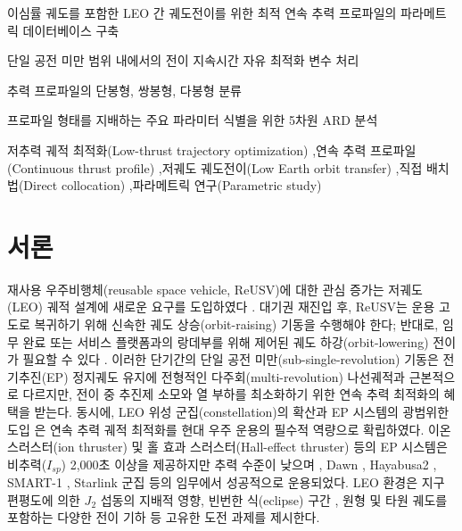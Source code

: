 \documentclass[a4paper,fleqn]{cas-dc}
\begin{document}

\begin{highlights}
\item 이심률 궤도를 포함한 LEO 간 궤도전이를 위한 최적 연속 추력 프로파일의 파라메트릭 데이터베이스 구축
\item 단일 공전 미만 범위 내에서의 전이 지속시간 자유 최적화 변수 처리
\item 추력 프로파일의 단봉형, 쌍봉형, 다봉형 분류
\item 프로파일 형태를 지배하는 주요 파라미터 식별을 위한 5차원 ARD 분석
\end{highlights}

\begin{keywords}
저추력 궤적 최적화(Low-thrust trajectory optimization) \sep 연속 추력 프로파일(Continuous thrust profile) \sep 저궤도 궤도전이(Low Earth orbit transfer) \sep 직접 배치법(Direct collocation) \sep 파라메트릭 연구(Parametric study)
\end{keywords}

\maketitle


\section{서론}\label{sec:introduction}

재사용 우주비행체(reusable space vehicle, ReUSV)에 대한 관심 증가는 저궤도(LEO) 궤적 설계에 새로운 요구를 도입하였다 \citep{Baiocco2021,Grantz2011}. 대기권 재진입 후, ReUSV는 운용 고도로 복귀하기 위해 신속한 궤도 상승(orbit-raising) 기동을 수행해야 한다; 반대로, 임무 완료 또는 서비스 플랫폼과의 랑데부를 위해 제어된 궤도 하강(orbit-lowering) 전이가 필요할 수 있다 \citep{Jung2025}. 이러한 단기간의 단일 공전 미만(sub-single-revolution) 기동은 전기추진(EP) 정지궤도 유지에 전형적인 다주회(multi-revolution) 나선궤적과 근본적으로 다르지만, 전이 중 추진제 소모와 열 부하를 최소화하기 위한 연속 추력 최적화의 혜택을 받는다. 동시에, LEO 위성 군집(constellation)의 확산과 EP 시스템의 광범위한 도입 \citep{Lev2019}은 연속 추력 궤적 최적화를 현대 우주 운용의 필수적 역량으로 확립하였다. 이온 스러스터(ion thruster) 및 홀 효과 스러스터(Hall-effect thruster) 등의 EP 시스템은 비추력($I_{sp}$) 2,000초 이상을 제공하지만 추력 수준이 낮으며 \citep{Jahn1968,Goebel2008}, Dawn \citep{Rayman2000}, Hayabusa2 \citep{Tsuda2020}, SMART-1 \citep{Racca2002}, Starlink 군집 \citep{SpaceNews2023} 등의 임무에서 성공적으로 운용되었다. LEO 환경은 지구 편평도에 의한 $J_2$ 섭동의 지배적 영향, 빈번한 식(eclipse) 구간 \citep{Graham2016}, 원형 및 타원 궤도를 포함하는 다양한 전이 기하 \citep{Topputo2014} 등 고유한 도전 과제를 제시한다.
\end{document}
